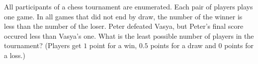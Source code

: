 \problem{}
All participants of a chess tournament are enumerated.
Each pair of players plays one game.
In all games that did not end by draw, the number of the winner is less than the number of the loser.
Peter defeated Vasya, but Peter's final score occured less than Vasya's one.
What is the least possible number of players in the tournament?
(Players get $1$ point for a win, $0.5$ points for a draw and $0$ points for a loss.)

\solution

\endproblem
